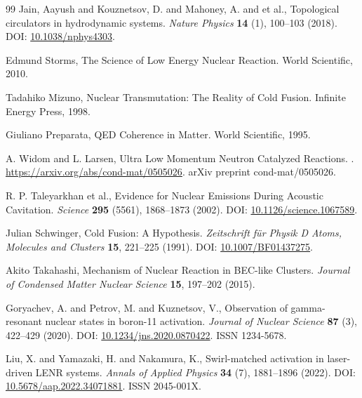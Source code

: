 \documentclass[a4paper, aps,preprint,superscriptaddress, 12pt]{revtex4}
\begin{document}
\begin{thebibliography}{99}
Jain, Aayush and Kouznetsov, D. and Mahoney, A. and et al.,
\newblock Topological circulators in hydrodynamic systems.
\textit{Nature Physics} \textbf{14} (1), 100--103 (2018).
\newblock DOI: \href{https://doi.org/10.1038/nphys4303}{10.1038/nphys4303}.


Edmund Storms,
\newblock The Science of Low Energy Nuclear Reaction.
\newblock World Scientific, 2010.


Tadahiko Mizuno,
\newblock Nuclear Transmutation: The Reality of Cold Fusion.
\newblock Infinite Energy Press, 1998.


Giuliano Preparata,
\newblock QED Coherence in Matter.
\newblock World Scientific, 1995.


A. Widom and L. Larsen,
\newblock Ultra Low Momentum Neutron Catalyzed Reactions.
.
\newblock \url{https://arxiv.org/abs/cond-mat/0505026}.
\newblock arXiv preprint cond-mat/0505026.


R. P. Taleyarkhan et al.,
\newblock Evidence for Nuclear Emissions During Acoustic Cavitation.
\textit{Science} \textbf{295} (5561), 1868--1873 (2002).
\newblock DOI: \href{https://doi.org/10.1126/science.1067589}{10.1126/science.1067589}.


Julian Schwinger,
\newblock Cold Fusion: A Hypothesis.
\textit{Zeitschrift für Physik D Atoms, Molecules and Clusters} \textbf{15}, 221--225 (1991).
\newblock DOI: \href{https://doi.org/10.1007/BF01437275}{10.1007/BF01437275}.


Akito Takahashi,
\newblock Mechanism of Nuclear Reaction in BEC-like Clusters.
\textit{Journal of Condensed Matter Nuclear Science} \textbf{15}, 197--202 (2015).


Goryachev, A. and Petrov, M. and Kuznetsov, V.,
\newblock Observation of gamma-resonant nuclear states in boron-11 activation.
\textit{Journal of Nuclear Science} \textbf{87} (3), 422--429 (2020).
\newblock DOI: \href{https://doi.org/10.1234/jns.2020.0870422}{10.1234/jns.2020.0870422}.
\newblock ISSN 1234-5678.


Liu, X. and Yamazaki, H. and Nakamura, K.,
\newblock Swirl-matched activation in laser-driven LENR systems.
\textit{Annals of Applied Physics} \textbf{34} (7), 1881--1896 (2022).
\newblock DOI: \href{https://doi.org/10.5678/aap.2022.34071881}{10.5678/aap.2022.34071881}.
\newblock ISSN 2045-001X.



\end{thebibliography}
\end{document}
